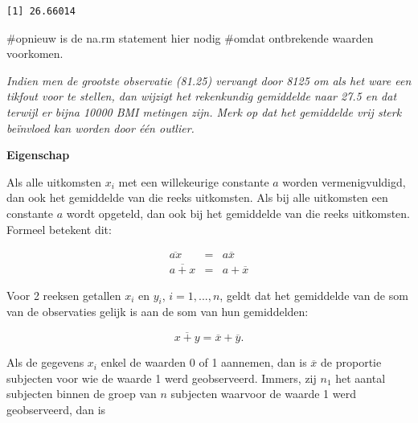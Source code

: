 \documentclass[
  dutch,
  letterpaper,
  12pt]{book}
\newenvironment{Shaded}{\begin{snugshade}}{\end{snugshade}}
\newcommand{\AttributeTok}[1]{\textcolor[rgb]{0.40,0.45,0.13}{#1}}
\newcommand{\CommentTok}[1]{\textcolor[rgb]{0.37,0.37,0.37}{#1}}
\newcommand{\ConstantTok}[1]{\textcolor[rgb]{0.56,0.35,0.01}{#1}}
\newcommand{\FunctionTok}[1]{\textcolor[rgb]{0.28,0.35,0.67}{#1}}
\newcommand{\NormalTok}[1]{\textcolor[rgb]{0.00,0.23,0.31}{#1}}
\newcommand{\SpecialCharTok}[1]{\textcolor[rgb]{0.37,0.37,0.37}{#1}}
\theoremstyle{definition}
\theoremstyle{definition}
\theoremstyle{definition}
\theoremstyle{remark}
\begin{document}
\begin{Shaded}
\end{Shaded}

\begin{verbatim}
[1] 26.66014
\end{verbatim}

\begin{Shaded}
\begin{Highlighting}[]
\CommentTok{\#opnieuw is de na.rm statement hier nodig}
\CommentTok{\#omdat ontbrekende waarden voorkomen.}
\end{Highlighting}
\end{Shaded}

\emph{Indien men de grootste observatie (81.25) vervangt door 8125 om
als het ware een tikfout voor te stellen, dan wijzigt het rekenkundig
gemiddelde naar 27.5 en dat terwijl er bijna 10000 BMI metingen zijn.
Merk op dat het gemiddelde vrij sterk beïnvloed kan worden door één
outlier.}

\textbf{Eigenschap}

Als alle uitkomsten \(x_i\) met een willekeurige constante \(a\) worden
vermenigvuldigd, dan ook het gemiddelde van die reeks uitkomsten. Als
bij alle uitkomsten een constante \(a\) wordt opgeteld, dan ook bij het
gemiddelde van die reeks uitkomsten. Formeel betekent dit:

\begin{eqnarray*}
\overline{ax} &= &a \overline{x} \\
\overline{a + x} &= &a + \overline{x}
\end{eqnarray*}

Voor 2 reeksen getallen \(x_i\) en \(y_i\), \(i=1,...,n\), geldt dat het
gemiddelde van de som van de observaties gelijk is aan de som van hun
gemiddelden:

\begin{equation*}
\overline{x + y} = \overline{x} + \overline{y}.
\end{equation*}

Als de gegevens \(x_i\) enkel de waarden 0 of 1 aannemen, dan is
\(\overline{x}\) de proportie subjecten voor wie de waarde 1 werd
geobserveerd. Immers, zij \(n_1\) het aantal subjecten binnen de groep
van \(n\) subjecten waarvoor de waarde 1 werd geobserveerd, dan is
\end{document}
